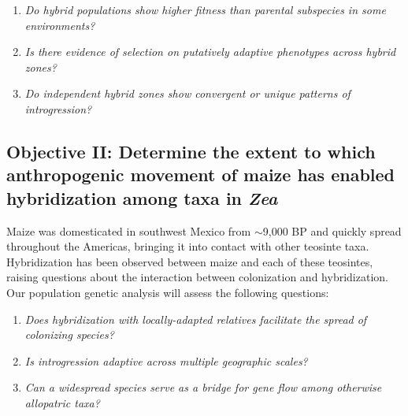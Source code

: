 \begin{enumerate}
\item \emph{Do hybrid populations show higher fitness than parental subspecies in some environments?}
\item \emph{Is there evidence of selection on putatively adaptive phenotypes across hybrid zones?}
\item \emph{Do independent hybrid zones show convergent or unique patterns of introgression?}
\end{enumerate}

\subsection*{Objective II: Determine the extent to which anthropogenic movement of maize has enabled hybridization among taxa in \emph{Zea}}
Maize was domesticated in southwest Mexico from \zp{} $\sim$9,000 BP \citep{Matsuoka2002} and quickly spread throughout the Americas, bringing it into contact with other teosinte taxa.
Hybridization has been observed between maize and each of these teosintes, raising questions about the interaction between colonization and hybridization. 
Our population genetic analysis will assess the following questions:
\begin{enumerate}
\item \emph{Does hybridization with locally-adapted relatives facilitate the spread of colonizing species?}
\item \emph{Is introgression adaptive across multiple geographic scales?}
\item \emph{Can a widespread species serve as a bridge for gene flow among otherwise allopatric taxa?} 
\end{enumerate}

